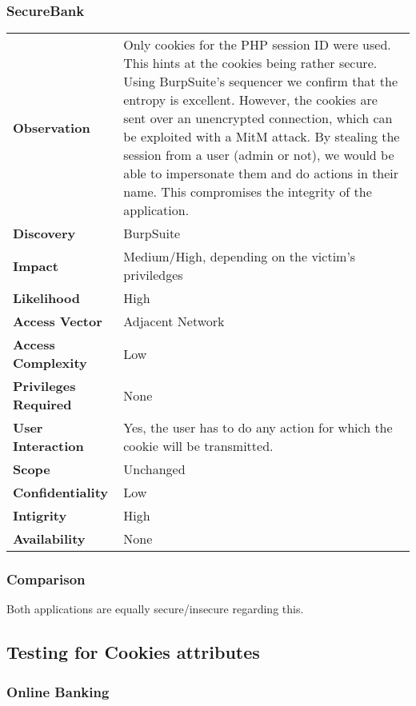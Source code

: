 \subsubsection*{SecureBank}

\begin{tabular}{l|p{10cm}}
\textbf{Observation} & Only cookies for the PHP session ID were used. This hints at the cookies being rather secure. Using BurpSuite's sequencer we confirm that the entropy is excellent. However, the cookies are sent over an unencrypted connection, which can be exploited with a MitM attack. By stealing the session from a user (admin or not), we would be able to impersonate them and do actions in their name. This compromises the integrity of the application. \\
\textbf{Discovery} & BurpSuite \\
\textbf{Impact} &Medium/High, depending on the victim's priviledges \\
\textbf{Likelihood} & High \\
\textbf{Access Vector} & Adjacent Network \\
\textbf{Access Complexity} & Low\\
\textbf{Privileges Required} & None \\
\textbf{User Interaction} & Yes, the user has to do any action for which the cookie will be transmitted. \\
\textbf{Scope} & Unchanged \\
\textbf{Confidentiality} & Low \\
\textbf{Intigrity} & High\\
\textbf{Availability} & None \\
\end{tabular}

\subsubsection*{Comparison}
Both applications are equally secure/insecure regarding this.

\clearpage


\subsection{Testing for Cookies attributes}

\subsubsection*{Online Banking}

